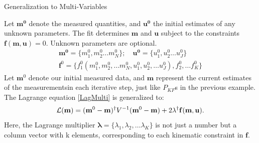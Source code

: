 \documentclass[
	xcolor=dvipsnames,
	aspectratio=169,	
	10pt, 
	]{beamer}
\begin{document}
\begin{frame}{Generalization to Multi-Variables}
	\begin{block}{}
		Let $\mathbf{m^0}$ denote the measured quantities, and $\mathbf {u^0}$ the initial estimates of any unknown parameters. The fit determines $\mathbf m$ and $\mathbf u$ subject to the constraints $\mathbf f(\mathbf{m,u})=0$. Unknown parameters are optional.
		\begin{align}
			\mathbf {m^0} =\{m_1^0,m_2^0\ldots m_N^0\};\quad \mathbf {u^0} =\{u_1^0,u_2^0\ldots u_J^0\}\nonumber\\
			\mathbf f^0 =\{f^0_1(m_1^0,m_2^0,\ldots m_N^0,u_1^0,u_2^0,\ldots u_J^0),f_2^0,\ldots f_K^0\}
		\end{align}
		 Let $\mathbf m^0$ denote our initial measured data, and $\mathbf m$ represent the current estimates of the measurementsin each iterative step, just like $P_{KF}$s in the previous example.
		 The Lagrange equation \eqref{LagMulti} is generalized to:
		\begin{align}
			\mathcal{L}(\mathbf{m}) = (\mathbf{m}^0-\mathbf{m})^\dagger V^{-1}(\mathbf{m}^0-\mathbf{m})+2\mathbf\lambda^\dagger \mathbf {f}(\mathbf{m,u}).\label{KFChi2}
		\end{align}
		Here, the Lagrange multiplier $\mathbf \lambda =\{\lambda_1,\lambda_2,\ldots\lambda_K\}$ is not just a number but a column vector with k elements, corresponding to each kinematic constraint in $\mathbf f$. 
	\end{block}
\end{frame}
\end{document}

